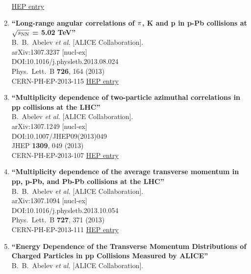 \begin{enumerate}
\href{http://inspirehep.net/record/1243863}{HEP entry}
\item%
{\bf ``Long-range angular correlations of $\rm \pi$, K and p in p-Pb collisions at $\sqrt{s_{\rm NN}}$ = 5.02 TeV''}
  \\{}B.~B.~Abelev {\it et al.} [ALICE Collaboration].
  \\{}arXiv:1307.3237 [nucl-ex]
  \\{}DOI:10.1016/j.physletb.2013.08.024
  \\{}Phys.\ Lett.\ B {\bf 726}, 164 (2013)
  \\{}CERN-PH-EP-2013-115
\href{http://inspirehep.net/record/1242302}{HEP entry}
\item%
{\bf ``Multiplicity dependence of two-particle azimuthal correlations in pp collisions at the LHC''}
  \\{}B.~Abelev {\it et al.} [ALICE Collaboration].
  \\{}arXiv:1307.1249 [nucl-ex]
  \\{}DOI:10.1007/JHEP09(2013)049
  \\{}JHEP {\bf 1309}, 049 (2013)
  \\{}CERN-PH-EP-2013-107
\href{http://inspirehep.net/record/1241570}{HEP entry}
\item%
{\bf ``Multiplicity dependence of the average transverse momentum in pp, \linebreak p-Pb, and Pb-Pb collisions at the LHC''}
  \\{}B.~B.~Abelev {\it et al.} [ALICE Collaboration].
  \\{}arXiv:1307.1094 [nucl-ex]
  \\{}DOI:10.1016/j.physletb.2013.10.054
  \\{}Phys.\ Lett.\ B {\bf 727}, 371 (2013)
  \\{}CERN-PH-EP-2013-111
\href{http://inspirehep.net/record/1241423}{HEP entry}
\item%
{\bf ``Energy Dependence of the Transverse Momentum Distributions of \linebreak Charged Particles in pp Collisions Measured by ALICE''}
  \\{}B.~B.~Abelev {\it et al.} [ALICE Collaboration].

\end{enumerate}
